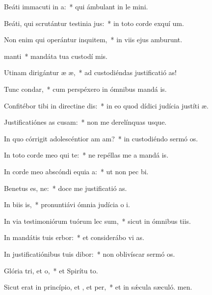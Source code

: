 \item Beáti immacuti in a:~* qui ámbulant in le mini.
\item Beáti, qui scrutántur testinia jus:~* in toto corde exquí um.
\item Non enim qui operántur inquitem,~* in viis ejus amburunt.
\item {} manti~* mandáta tua custodí mis.
\item Utinam dirigántur æ æ,~* ad custodiéndas justificatió as!
\item Tunc  condar,~* cum perspéxero in ómnibus mandá is.
\item Confitébor tibi in directine dis:~* in eo quod dídici judícia justíti æ.
\item Justificatiónes as cusam:~* non me derelínquas usque.
\item In quo córrigit adolescéntior am am?~* in custodiéndo sermó os.
\item In toto corde meo qui te:~* ne repéllas me a mandá is.
\item In corde meo abscóndi equia a:~* ut non pec bi.
\item Benetus es, ne:~* doce me justificatió as.
\item In biis is,~* pronuntiávi ómnia judícia o i.
\item In via testimoniórum tuórum lec sum,~* sicut in ómnibus tiis.
\item In mandátis tuis erbor:~* et considerábo vi as.
\item In justificatiónibus tuis dibor:~* non oblivíscar sermó os.
\item Glória tri, et o,~* et Spirítu to.
\item Sicut erat in princípio, et , et per,~* et in sǽcula sæculó. men.
